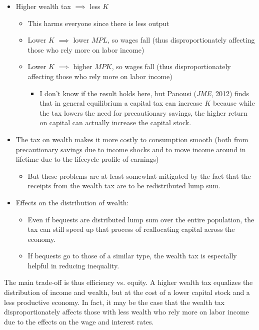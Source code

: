 \documentclass[article,11pt,letterpaper,fleqn]{article}
\theoremstyle{definition}
\numberwithin{equation}{section}
\begin{document}
\begin{itemize}
\item Higher wealth tax $\implies$ less $K$
	\begin{itemize}
	\item This harms everyone since there is less output
	\item Lower $K$ $\implies$ lower $MPL$, so wages fall (thus disproportionately affecting those who rely more on labor income)
	\item Lower $K$ $\implies$ higher $MPK$, so wages fall (thus disproportionately affecting those who rely more on labor income)
		\begin{itemize}
		\item I don't know if the result holds here, but Panousi (\emph{JME}, 2012) finds that in general equilibrium a capital tax can increase $K$ because while the tax lowers the need for precautionary savings, the higher return on capital can actually increase the capital stock.
		\end{itemize}
	\end{itemize}
\item The tax on wealth makes it more costly to consumption smooth (both from precautionary savings due to income shocks and to move income around in lifetime due to the lifecycle profile of earnings)
	\begin{itemize}
	\item But these problems are at least somewhat mitigated by the fact that the receipts from the wealth tax are to be redistributed lump sum.
	\end{itemize}
\item Effects on the distribution of wealth:
	\begin{itemize}
	\item Even if bequests are distributed lump sum over the entire population, the tax can still speed up that process of reallocating capital across the economy.
	\item If bequests go to those of a similar type, the wealth tax is especially helpful in reducing inequality.
	\end{itemize}
\end{itemize}

The main trade-off is thus efficiency vs. equity.  A higher wealth tax equalizes the distribution of income and wealth, but at the cost of a lower capital stock and a less productive economy.  In fact, it may be the case that the wealth tax disproportionately affects those with less wealth who rely more on labor income due to the effects on the wage and interest rates.
\end{document}
